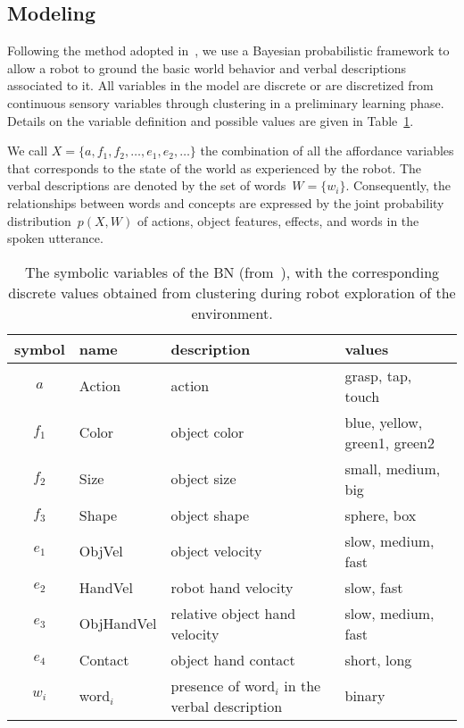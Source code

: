 \subsection{\AffWords{} Modeling}
\label{sec:bn}

Following the method adopted in~\cite{salvi:2012:smcb}, we use a Bayesian probabilistic framework to allow a robot to ground the basic world behavior and verbal descriptions associated to it.
All variables in the model are discrete or are discretized from continuous sensory variables through clustering in a preliminary learning phase.
Details on the variable definition and possible values are given in Table~\ref{tab:bnsymb}.

We call $X = \{a, f_1, f_2, \dots, e_1, e_2, \dots\}$ the combination of all the affordance variables that corresponds to the state of the world as experienced by the robot. The verbal descriptions are denoted by the set of words~$W = \{w_i\}$. Consequently, the relationships between words and concepts are expressed by the joint probability distribution~$p(X,W)$ of actions, object features, effects, and words in the spoken utterance.

\begin{table}
    \centering
    \caption{The symbolic variables of the \acl{BN} (from~\cite{salvi:2012:smcb}), with the corresponding discrete values obtained from clustering during robot exploration of the environment.}
    \label{tab:bnsymb}
    \begin{tabular}{clp{2.7cm}p{2.5cm}}
    \toprule
    symbol & name   & description     & values \\
    \midrule
    $a$ & Action & action          & grasp, tap, touch \\
    \midrule
    $f_1$ & Color   & object color   & blue, yellow, green1, green2 \\
    $f_2$ & Size   & object size     & small, medium, big \\
    $f_3$ & Shape  & object shape    & sphere, box \\
    \midrule
    $e_1$ & ObjVel & object velocity & slow, medium, fast \\
    $e_2$ & HandVel & robot hand velocity & slow, fast \\
    $e_3$ & ObjHandVel & relative object hand velocity & slow, medium, fast \\
    $e_4$ & Contact & object hand contact & short, long \\
    \midrule
    $w_i$ & word$_i$ & presence of word$_i$ in the verbal description & binary \\
    \bottomrule
    \end{tabular}
\end{table}

